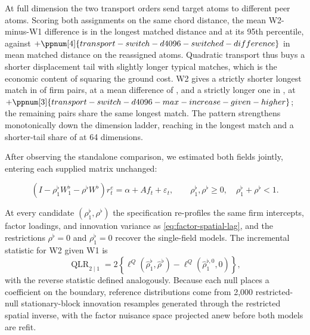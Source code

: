 At full dimension the two transport orders send
 target atoms to different peer
atoms.
Scoring both assignments on the same chord distance, the mean W2-minus-W1
difference is  in the longest
matched distance and  at its
95th percentile, against
$+\ppnum[4]{transport-switch-d4096-switched-difference}$ in mean matched
distance on the reassigned atoms.
Quadratic transport thus buys a shorter displacement tail with slightly longer
typical matches, which is the economic content of squaring the ground cost.
W2 gives a strictly shorter longest match in
 of firm pairs, at a mean
difference of , and
a strictly longer one in
, at
$+\ppnum[3]{transport-switch-d4096-max-increase-given-higher}$; the remaining
pairs share the same longest match.
The pattern strengthens monotonically down the dimension ladder, reaching
 in the longest match and a
shorter-tail share of  at 64
dimensions.

After observing the standalone comparison, we estimated both fields jointly,
entering each supplied matrix unchanged:

\begin{equation}\label{eq:factor-two-field-transport}
  (I-\rho^\flat_1 W^\flat_1-\rho^\flat W^\flat)r_t^e
  =\alpha+A f_t+\varepsilon_t,
  \qquad
  \rho^\flat_1,\rho^\flat\geq 0,
  \quad \rho^\flat_1+\rho^\flat<1.
\end{equation}

At every candidate $(\rho^\flat_1,\rho^\flat)$ the specification re-profiles the same
firm intercepts, factor loadings, and innovation variance as
\eqref{eq:factor-spatial-lag}, and the restrictions $\rho^\flat=0$ and $\rho^\flat_1=0$
recover the single-field models.
The incremental statistic for W2 given W1 is
\[
  \operatorname{QLR}_{2\mid 1}
  =2\left\{
    \ell^Q(\hat\rho^\flat_1,\hat\rho^\flat)
    -\ell^Q(\hat\rho^{\flat,0}_1,0)
  \right\},
\]
with the reverse statistic defined analogously.
Because each null places a coefficient on the boundary, reference distributions
come from 2,000 restricted-null stationary-block innovation resamples generated
through the restricted spatial inverse, with the factor nuisance space projected
anew before both models are refit.

